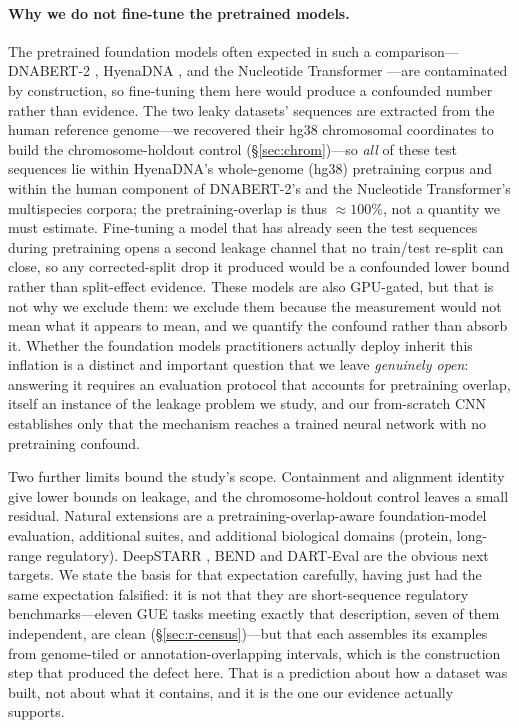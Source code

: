 \documentclass[webpdf,modern,large,namedate]{oup-authoring-template}%
\begin{document}
\paragraph{Why we do not fine-tune the pretrained models.}
The pretrained foundation models often expected in such a comparison---DNABERT-2 \citep{zhou2023dnabert2}, HyenaDNA \citep{nguyen2023hyenadna}, and the Nucleotide Transformer \citep{dallatorre2024nucleotide}---are contaminated by construction, so fine-tuning them here would produce a confounded number rather than evidence. The two leaky datasets' sequences are extracted from the human reference genome---we recovered their hg38 chromosomal coordinates to build the chromosome-holdout control (\S\ref{sec:chrom})---so \emph{all} of these test sequences lie within HyenaDNA's whole-genome (hg38) pretraining corpus and within the human component of DNABERT-2's and the Nucleotide Transformer's multispecies corpora; the pretraining-overlap is thus $\approx100\%$, not a quantity we must estimate. Fine-tuning a model that has already seen the test sequences during pretraining opens a second leakage channel that no train/test re-split can close, so any corrected-split drop it produced would be a confounded lower bound rather than split-effect evidence. These models are also GPU-gated, but that is not why we exclude them: we exclude them because the measurement would not mean what it appears to mean, and we quantify the confound rather than absorb it. Whether the foundation models practitioners actually deploy inherit this inflation is a distinct and important question that we leave \emph{genuinely open}: answering it requires an evaluation protocol that accounts for pretraining overlap, itself an instance of the leakage problem we study, and our from-scratch CNN establishes only that the mechanism reaches a trained neural network with no pretraining confound. 

Two further limits bound the study's scope. Containment and alignment identity give lower bounds on leakage, and the chromosome-holdout control leaves a small residual. Natural extensions are a pretraining-overlap-aware foundation-model evaluation, additional suites, and additional biological domains (protein, long-range regulatory). DeepSTARR \citep{dealmeida2022deepstarr}, BEND \citep{marin2024bend} and DART-Eval \citep{patel2024darteval} are the obvious next targets. We state the basis for that expectation carefully, having just had the same expectation falsified: it is not that they are short-sequence regulatory benchmarks---eleven GUE tasks meeting exactly that description, seven of them independent, are clean (\S\ref{sec:r-census})---but that each assembles its examples from genome-tiled or annotation-overlapping intervals, which is the construction step that produced the defect here. That is a prediction about how a dataset was built, not about what it contains, and it is the one our evidence actually supports.
\end{document}
